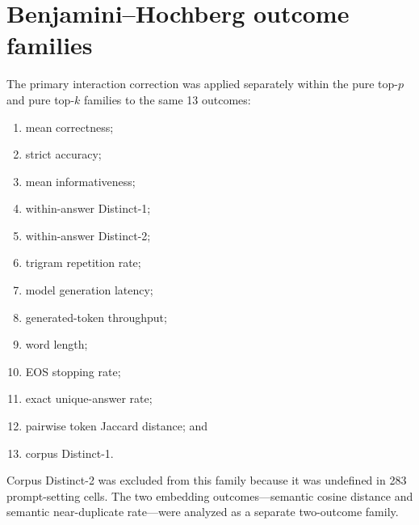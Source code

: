 \documentclass[11pt]{article}
\begin{document}
\section{Benjamini--Hochberg outcome families}
\label{app:bh-family}

The primary interaction correction was applied separately within the pure
top-$p$ and pure top-$k$ families to the same 13 outcomes:

\begin{enumerate}
\item mean correctness;
\item strict accuracy;
\item mean informativeness;
\item within-answer Distinct-1;
\item within-answer Distinct-2;
\item trigram repetition rate;
\item model generation latency;
\item generated-token throughput;
\item word length;
\item EOS stopping rate;
\item exact unique-answer rate;
\item pairwise token Jaccard distance; and
\item corpus Distinct-1.
\end{enumerate}

Corpus Distinct-2 was excluded from this family because it was undefined in
283 prompt-setting cells. The two embedding outcomes---semantic cosine
distance and semantic near-duplicate rate---were analyzed as a separate
two-outcome family.
\end{document}
